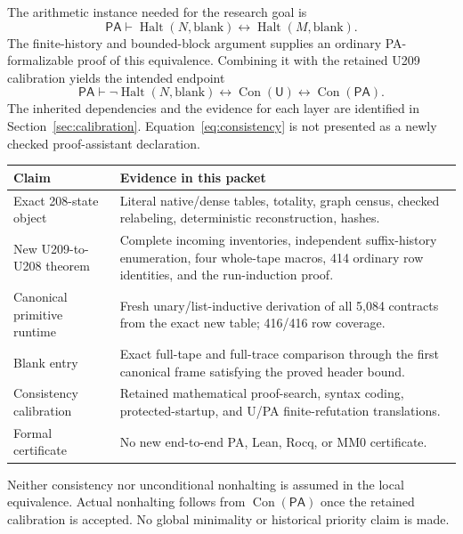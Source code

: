 \documentclass[11pt,letterpaper]{article}
\newcommand{\PA}{\mathsf{PA}}
\newcommand{\UU}{\mathsf U}
\newcommand{\Con}{\operatorname{Con}}
\newcommand{\Halt}{\operatorname{Halt}}
\begin{document}
The arithmetic instance needed for the research goal is
\begin{equation}\label{eq:localPA}
 \PA\vdash
 \Halt(N,\mathrm{blank})\longleftrightarrow
 \Halt(M,\mathrm{blank}).
\end{equation}
The finite-history and bounded-block argument supplies an ordinary
PA-formalizable proof of this equivalence. Combining it with the retained
U209 calibration yields the intended endpoint
\begin{equation}\label{eq:consistency}
 \PA\vdash
 \neg\Halt(N,\mathrm{blank})\longleftrightarrow
 \Con(\UU)\longleftrightarrow\Con(\PA).
\end{equation}
The inherited dependencies and the evidence for each layer are identified
in Section~\ref{sec:calibration}. Equation~\eqref{eq:consistency} is not
presented as a newly checked proof-assistant declaration.

\begin{center}\small
\begin{tabularx}{\linewidth}{@{}p{37mm}X@{}}
\toprule
Claim & Evidence in this packet\\
\midrule
Exact 208-state object & Literal native/dense tables, totality, graph census,
checked relabeling, deterministic reconstruction, hashes.\\
New U209-to-U208 theorem & Complete incoming inventories, independent
suffix-history enumeration, four whole-tape macros, 414 ordinary row identities,
and the run-induction proof.\\
Canonical primitive runtime & Fresh unary/list-inductive derivation of all
5,084 contracts from the exact new table; 416/416 row coverage.\\
Blank entry & Exact full-tape and full-trace comparison through the first
canonical frame satisfying the proved header bound.\\
Consistency calibration & Retained mathematical proof-search, syntax coding,
protected-startup, and U/PA finite-refutation translations.\\
Formal certificate & No new end-to-end PA, Lean, Rocq, or MM0 certificate.\\
\bottomrule
\end{tabularx}
\end{center}
Neither consistency nor unconditional nonhalting is assumed in the local
equivalence. Actual nonhalting follows from $\Con(\PA)$ once the retained
calibration is accepted. No global minimality or historical priority claim
is made.
\end{document}
